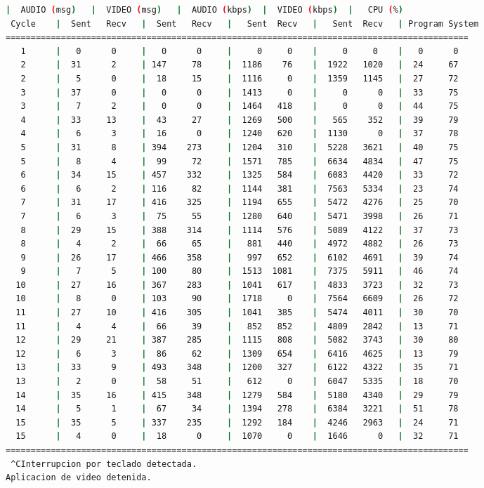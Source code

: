 \begin{adjustbox}{max width=\textwidth}
\begin{lstlisting}[language=bash,basicstyle=\ttfamily\scriptsize]
          |  AUDIO (msg)   |  VIDEO (msg)   |  AUDIO (kbps)  |  VIDEO (kbps)  |   CPU (%)
 Cycle    |  Sent   Recv   |  Sent   Recv   |   Sent  Recv   |   Sent  Recv   | Program System
============================================================================================
   1      |   0      0     |   0      0     |     0     0    |     0     0    |   0      0
   2      |  31      2     | 147     78     |  1186    76    |  1922   1020   |  24     67
   2      |   5      0     |  18     15     |  1116     0    |  1359   1145   |  27     72
   3      |  37      0     |   0      0     |  1413     0    |     0      0   |  33     75
   3      |   7      2     |   0      0     |  1464   418    |     0      0   |  44     75
   4      |  33     13     |  43     27     |  1269   500    |   565    352   |  39     79
   4      |   6      3     |  16      0     |  1240   620    |  1130      0   |  37     78
   5      |  31      8     | 394    273     |  1204   310    |  5228   3621   |  40     75
   5      |   8      4     |  99     72     |  1571   785    |  6634   4834   |  47     75
   6      |  34     15     | 457    332     |  1325   584    |  6083   4420   |  33     72
   6      |   6      2     | 116     82     |  1144   381    |  7563   5334   |  23     74
   7      |  31     17     | 416    325     |  1194   655    |  5472   4276   |  25     70
   7      |   6      3     |  75     55     |  1280   640    |  5471   3998   |  26     71
   8      |  29     15     | 388    314     |  1114   576    |  5089   4122   |  37     73
   8      |   4      2     |  66     65     |   881   440    |  4972   4882   |  26     73
   9      |  26     17     | 466    358     |   997   652    |  6102   4691   |  39     74
   9      |   7      5     | 100     80     |  1513  1081    |  7375   5911   |  46     74
  10      |  27     16     | 367    283     |  1041   617    |  4833   3723   |  32     73
  10      |   8      0     | 103     90     |  1718     0    |  7564   6609   |  26     72
  11      |  27     10     | 416    305     |  1041   385    |  5474   4011   |  30     70
  11      |   4      4     |  66     39     |   852   852    |  4809   2842   |  13     71
  12      |  29     21     | 387    285     |  1115   808    |  5082   3743   |  30     80
  12      |   6      3     |  86     62     |  1309   654    |  6416   4625   |  13     79
  13      |  33      9     | 493    348     |  1200   327    |  6122   4322   |  35     71
  13      |   2      0     |  58     51     |   612     0    |  6047   5335   |  18     70
  14      |  35     16     | 415    348     |  1279   584    |  5180   4340   |  29     79
  14      |   5      1     |  67     34     |  1394   278    |  6384   3221   |  51     78
  15      |  35      5     | 337    235     |  1292   184    |  4246   2963   |  24     71
  15      |   4      0     |  18      0     |  1070     0    |  1646      0   |  32     71
============================================================================================
 ^CInterrupcion por teclado detectada.
Aplicacion de video detenida.


\end{lstlisting}
\end{adjustbox}
